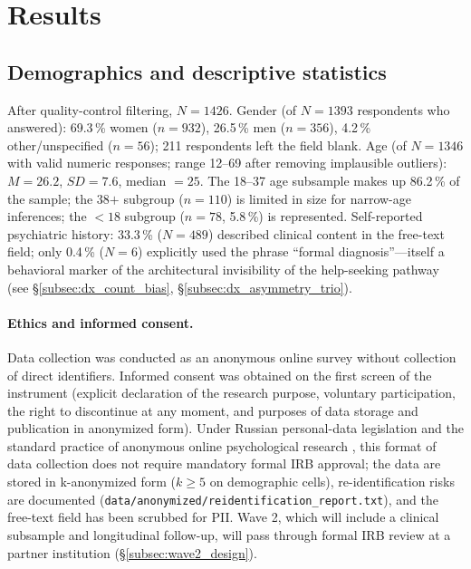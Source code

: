 \section{Results}
\label{sec:results}

\subsection{Demographics and descriptive statistics}

After quality-control filtering, $N = 1426$. Gender (of $N = 1393$ respondents who answered): 69.3\,\% women ($n = 932$), 26.5\,\% men ($n = 356$), 4.2\,\% other/unspecified ($n = 56$); 211 respondents left the field blank. Age (of $N = 1346$ with valid numeric responses; range 12--69 after removing implausible outliers): $M = 26.2$, $SD = 7.6$, median $= 25$. The 18--37 age subsample makes up 86.2\,\% of the sample; the 38$+$ subgroup ($n = 110$) is limited in size for narrow-age inferences; the $<18$ subgroup ($n = 78$, 5.8\,\%) is represented. Self-reported psychiatric history: 33.3\,\% ($N = 489$) described clinical content in the free-text field; only 0.4\,\% ($N = 6$) explicitly used the phrase ``formal diagnosis''---itself a behavioral marker of the architectural invisibility of the help-seeking pathway (see §\ref{subsec:dx_count_bias}, §\ref{subsec:dx_asymmetry_trio}).

\paragraph{Ethics and informed consent.} Data collection was conducted as an anonymous online survey without collection of direct identifiers. Informed consent was obtained on the first screen of the instrument (explicit declaration of the research purpose, voluntary participation, the right to discontinue at any moment, and purposes of data storage and publication in anonymized form). Under Russian personal-data legislation and the standard practice of anonymous online psychological research \citep{nosek2012}, this format of data collection does not require mandatory formal IRB approval; the data are stored in k-anonymized form ($k \geq 5$ on demographic cells), re-identification risks are documented (\texttt{data/anonymized/reidentification\_report.txt}), and the free-text field has been scrubbed for PII. Wave 2, which will include a clinical subsample and longitudinal follow-up, will pass through formal IRB review at a partner institution (§\ref{subsec:wave2_design}).

